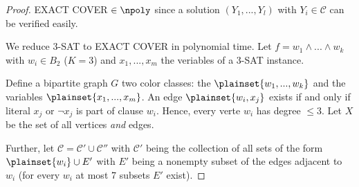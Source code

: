 \begin{proof}
	EXACT COVER $\in \npoly$ since a solution $(Y_1, ..., Y_l)$ with $Y_i \in \mathcal C$ can be verified easily. 
	
	We reduce 3-SAT to EXACT COVER in polynomial time. Let $f=w_1 \wedge ... \wedge w_k$ with $w_i \in B_2$ ($K=3$) and $x_1, ..., x_m$ the veriables of a 3-SAT instance.
	
	Define a bipartite graph $G$ two color classes: the $\plainset{w_1, ..., w_k}$ and the variables $\plainset{x_1, ..., x_m}$. An edge $\plainset{w_i, x_j}$ exists if and only if literal $x_j$ or $\neg x_j$ is part of clause $w_i$. Hence, every verte $w_i$ has degree $\leq 3$. Let $X$ be the set of all vertices \emph{and} edges.
	
	Further, let $\mathcal C = \mathcal C' \cup \mathcal C''$ with $\mathcal C'$ being the collection of all sets of the form $\plainset{w_i} \cup E'$ with $E'$ being a nonempty subset of the edges adjacent to $w_i$ (for every $w_i$ at most 7 subsets $E'$ exist).
\end{proof}

